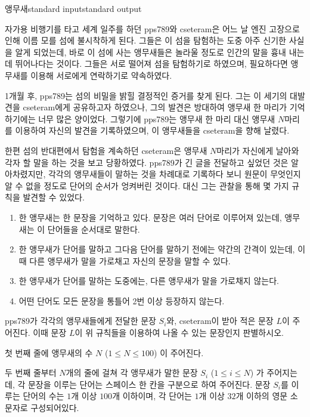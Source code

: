 \begin{problem}{앵무새}{standard input}{standard output}

자가용 비행기를 타고 세계 일주를 하던 pps789와 cseteram은 어느 날 엔진 고장으로 인해 이름 모를 섬에 불시착하게 된다. 그들은 이 섬을 탐험하는 도중 아주 신기한 사실을 알게 되었는데, 바로 이 섬에 사는 앵무새들은 놀라울 정도로 인간의 말을 흉내 내는 데 뛰어나다는 것이다. 그들은 서로 떨어져 섬을 탐험하기로 하였으며, 필요하다면 앵무새를 이용해 서로에게 연락하기로 약속하였다.

1개월 후, pps789는 섬의 비밀을 밝힐 결정적인 증거를 찾게 된다. 그는 이 세기의 대발견을 cseteram에게 공유하고자 하였으나, 그의 발견은 방대하여 앵무새 한 마리가 기억하기에는 너무 많은 양이었다. 그렇기에 pps789는 앵무새 한 마리 대신 앵무새 $N$마리를 이용하여 자신의 발견을 기록하였으며, 이 앵무새들을 cseteram을 향해 날렸다.

한편 섬의 반대편에서 탐험을 계속하던 cseteram은 앵무새 $N$마리가 자신에게 날아와 각자 할 말을 하는 것을 보고 당황하였다. pps789가 긴 글을 전달하고 싶었던 것은 알아차렸지만, 각각의 앵무새들이 말하는 것을 차례대로 기록하다 보니 원문이 무엇인지 알 수 없을 정도로 단어의 순서가 엉켜버린 것이다. 대신 그는 관찰을 통해 몇 가지 규칙을 발견할 수 있었다.

\begin{enumerate}
\item{한 앵무새는 한 문장을 기억하고 있다. 문장은 여러 단어로 이루어져 있는데, 앵무새는 이 단어들을 순서대로 말한다.}
\item{한 앵무새가 단어를 말하고 그다음 단어를 말하기 전에는 약간의 간격이 있는데, 이때 다른 앵무새가 말을 가로채고 자신의 문장을 말할 수 있다.}
\item{한 앵무새가 단어를 말하는 도중에는, 다른 앵무새가 말을 가로채지 않는다.}
\item{어떤 단어도 모든 문장을 통틀어 2번 이상 등장하지 않는다.}
\end{enumerate}

pps789가 각각의 앵무새들에게 전달한 문장 $S_i$와, cseteram이 받아 적은 문장 $L$이 주어진다. 이때 문장 $L$이 위 규칙들을 이용하여 나올 수 있는 문장인지 판별하시오.

\InputFile
첫 번째 줄에 앵무새의 수 $N$ ($1 \le N \le 100$) 이 주어진다.

두 번째 줄부터 $N$개의 줄에 걸쳐 각 앵무새가 말한 문장 $S_i$ ($1 \le i \le N$) 가 주어지는데, 각 문장을 이루는 단어는 스페이스 한 칸을 구분으로 하여 주어진다. 문장 $S_i$를 이루는 단어의 수는 $1$개 이상 $100$개 이하이며, 각 단어는 $1$개 이상 $32$개 이하의 영문 소문자로 구성되어있다.


\end{problem}
